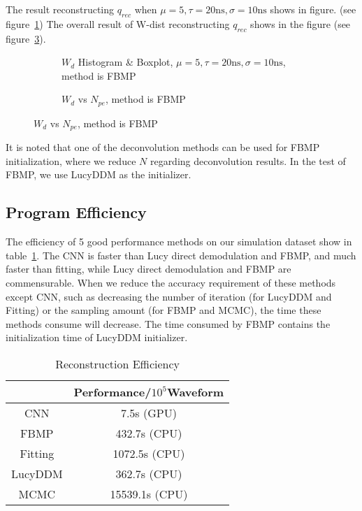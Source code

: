The result reconstructing $q_{rec}$ when $\mu=5, \tau=20\mathrm{ns}, \sigma=10\mathrm{ns}$ shows in figure. (see figure~\ref{fig:fbmp-hist}) The overall result of W-dist reconstructing $q_{rec}$ shows in the figure (see figure~\ref{fig:fbmp-npe}). 

\begin{figure}[H]
\begin{minipage}[t]{.5\textwidth}
\begin{figure}[H]
    \centering
    \resizebox{\textwidth}{!}{}
    \caption{\label{fig:fbmp-hist} $W_{d}$ Histogram \& Boxplot, $\mu=5, \tau=20\mathrm{ns}, \sigma=10\mathrm{ns}$, method is FBMP}
\end{figure}
\end{minipage}
\begin{minipage}[t]{.5\textwidth}
\begin{figure}[H]
    \centering
    \resizebox{\textwidth}{!}{}
    \caption{\label{fig:fbmp-npe} $W_{d}$ vs $N_{pe}$, method is FBMP}
\end{figure}
\end{minipage}
\end{figure}

It is noted that one of the deconvolution methods can be used for FBMP initialization, where we reduce $N$ regarding deconvolution results. In the test of FBMP, we use LucyDDM as the initializer. 

\subsection{Program Efficiency}

The efficiency of 5 good performance methods on our simulation dataset show in table~\ref{fig:efficiency}. The CNN is faster than Lucy direct demodulation and FBMP, and much faster than fitting, while Lucy direct demodulation and FBMP are commensurable. When we reduce the accuracy requirement of these methods except CNN, such as decreasing the number of iteration (for LucyDDM and Fitting) or the sampling amount (for FBMP and MCMC), the time these methods consume will decrease. The time consumed by FBMP contains the initialization time of LucyDDM initializer. 

\begin{table}[H]
    \centering
    \caption{\label{fig:efficiency} Reconstruction Efficiency}
    \begin{tabular}{c|c}
        \hline
        & Performance/$10^{5}$Waveform \\
        \hline
        CNN & 7.5s (GPU) \\
        \hline
        FBMP & 432.7s (CPU) \\
        \hline
        Fitting & 1072.5s (CPU) \\
        \hline
        LucyDDM & 362.7s (CPU) \\
        \hline
        MCMC & 15539.1s (CPU) \\
        \hline
    \end{tabular}
\end{table}
\hspace{4mm}

